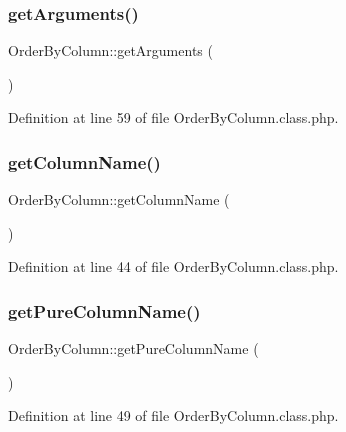 \subsubsection{\texorpdfstring{get\+Arguments()}{getArguments()}}
{\footnotesize\ttfamily Order\+By\+Column\+::get\+Arguments (\begin{DoxyParamCaption}{ }\end{DoxyParamCaption})}



Definition at line 59 of file Order\+By\+Column.\+class.\+php.

\hypertarget{classOrderByColumn_aa6e094dc084a79fa96a6cc529ac4431f}{}\label{classOrderByColumn_aa6e094dc084a79fa96a6cc529ac4431f} 
\subsubsection{\texorpdfstring{get\+Column\+Name()}{getColumnName()}}
{\footnotesize\ttfamily Order\+By\+Column\+::get\+Column\+Name (\begin{DoxyParamCaption}{ }\end{DoxyParamCaption})}



Definition at line 44 of file Order\+By\+Column.\+class.\+php.

\hypertarget{classOrderByColumn_a11d8fa0bb15e4089d6cedde469f51aa7}{}\label{classOrderByColumn_a11d8fa0bb15e4089d6cedde469f51aa7} 
\subsubsection{\texorpdfstring{get\+Pure\+Column\+Name()}{getPureColumnName()}}
{\footnotesize\ttfamily Order\+By\+Column\+::get\+Pure\+Column\+Name (\begin{DoxyParamCaption}{ }\end{DoxyParamCaption})}



Definition at line 49 of file Order\+By\+Column.\+class.\+php.

\hypertarget{classOrderByColumn_a7279ca2da1f1376de633eef931ff86ff}{}\label{classOrderByColumn_a7279ca2da1f1376de633eef931ff86ff} 
